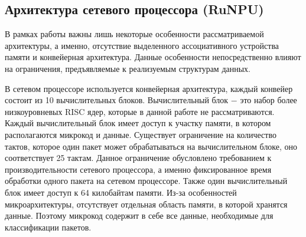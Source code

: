 \documentclass[oneside,final,12pt]{extarticle}
\begin{document}
        \subsection{Архитектура сетевого процессора (RuNPU)}
            \label{sect:arch}
            В рамках работы важны лишь некоторые особенности рассматриваемой архитектуры, а именно, отсутствие выделенного ассоциативного устройства памяти и конвейерная архитектура. 
            Данные особенности непосредственно влияют на ограничения, предъявляемые к реализуемым структурам данных.

            В сетевом процессоре используется конвейерная архитектура, каждый конвейер состоит из 10 вычислительных блоков. 
            Вычислительный блок $-$ это набор более низкоуровневых RISC ядер, которые в данной работе не рассматриваются. 
            Каждый вычислительный блок имеет доступ к участку памяти, в котором располагаются микрокод и данные.
            Существует ограничение на количество тактов, которое один пакет может обрабатываться на вычислительном блоке, оно соответствует 25 тактам.
            Данное ограничение обусловлено требованием к производительности сетевого процессора, а именно фиксированное время обработки одного пакета на сетевом процессоре.
            Также один вычислительный блок имеет доступ к 64 килобайтам памяти.
            Из-за особенностей микроархитектуры, отсутствует отдельная область памяти, в которой хранятся данные. Поэтому микрокод содержит в себе все данные,
            необходимые для классификации пакетов.
\end{document}
